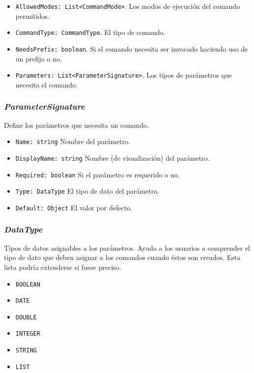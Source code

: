 \begin{itemize}
	\item \verb|AllowedModes: List<CommandMode>|. Los modos de ejecución del comando permitidos.
	\item \verb|CommandType: CommandType|. El tipo de comando.
	\item \verb|NeedsPrefix: boolean|. Si el comando necesita ser invocado haciendo uso de un prefijo o no.
	\item \verb|Parameters: List<ParameterSignature>|. Los tipos de parámetros que necesita el comando.
\end{itemize}


\subsubsection{\textit{ParameterSignature}}

Define los parámetros que necesita un comando.

\begin{itemize}
	\item \verb|Name: string| Nombre del parámetro.
	\item \verb|DisplayName: string| Nombre (de visualización) del parámetro.
	\item \verb|Required: boolean| Si el parámetro es requerido o no.
	\item \verb|Type: DataType| El tipo de dato del parámetro.
	\item \verb|Default: Object| El valor por defecto.
\end{itemize}


\subsubsection{\textit{DataType}}

Tipos de datos asignables a los parámetros. Ayuda a los usuarios a comprender el tipo de dato que deben asignar a los comandos cuando éstos son creados. Esta lista podría extenderse si fuese preciso.

\begin{itemize}
	\item \verb|BOOLEAN|
	\item \verb|DATE|
	\item \verb|DOUBLE|
	\item \verb|INTEGER|
	\item \verb|STRING|
	\item \verb|LIST|
\end{itemize}


